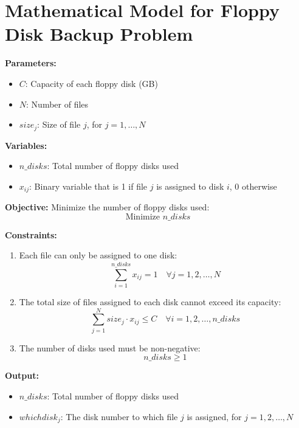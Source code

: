 \documentclass{article}
\begin{document}
\section*{Mathematical Model for Floppy Disk Backup Problem}

\textbf{Parameters:}
\begin{itemize}
    \item $C$: Capacity of each floppy disk (GB)
    \item $N$: Number of files
    \item $size_j$: Size of file $j$, for $j = 1, \ldots, N$
\end{itemize}

\textbf{Variables:}
\begin{itemize}
    \item $n\_disks$: Total number of floppy disks used
    \item $x_{ij}$: Binary variable that is 1 if file $j$ is assigned to disk $i$, 0 otherwise
\end{itemize}

\textbf{Objective:} 
Minimize the number of floppy disks used:
\[
\text{Minimize } n\_disks
\]

\textbf{Constraints:}
\begin{enumerate}
    \item Each file can only be assigned to one disk:
    \[
    \sum_{i=1}^{n\_disks} x_{ij} = 1 \quad \forall j = 1, 2, \ldots, N
    \]

    \item The total size of files assigned to each disk cannot exceed its capacity:
    \[
    \sum_{j=1}^{N} size_j \cdot x_{ij} \leq C \quad \forall i = 1, 2, \ldots, n\_disks
    \]

    \item The number of disks used must be non-negative:
    \[
    n\_disks \geq 1
    \]
\end{enumerate}

\textbf{Output:}
\begin{itemize}
    \item $n\_disks$: Total number of floppy disks used
    \item $whichdisk_j$: The disk number to which file $j$ is assigned, for $j = 1, 2, \ldots, N$
\end{itemize}
\end{document}
